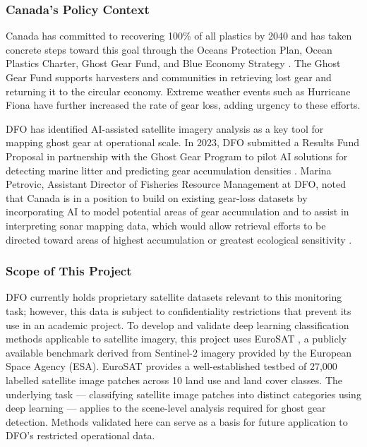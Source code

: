 \documentclass[12pt, letterpaper]{article}
\begin{document}
\subsubsection*{Canada's Policy Context}

Canada has committed to recovering 100\% of all plastics by 2040 and has taken
concrete steps toward this goal through the Oceans Protection Plan, Ocean Plastics
Charter, Ghost Gear Fund, and Blue Economy Strategy \cite{dfopsdc2023}. The Ghost
Gear Fund supports harvesters and communities in retrieving lost gear and returning
it to the circular economy. Extreme weather events such as Hurricane Fiona have
further increased the rate of gear loss, adding urgency to these efforts.

DFO has identified AI-assisted satellite imagery analysis as a key tool for mapping
ghost gear at operational scale. In 2023, DFO submitted a Results Fund Proposal in
partnership with the Ghost Gear Program to pilot AI solutions for detecting marine
litter and predicting gear accumulation densities \cite{dfopsdc2023}. Marina Petrovic,
Assistant Director of Fisheries Resource Management at DFO, noted that Canada is
in a position to build on existing gear-loss datasets by incorporating AI to model
potential areas of gear accumulation and to assist in interpreting sonar mapping
data, which would allow retrieval efforts to be directed toward areas of highest
accumulation or greatest ecological sensitivity \cite{dfopsdc2023}.

\subsubsection*{Scope of This Project}

DFO currently holds proprietary satellite datasets relevant to this monitoring task;
however, this data is subject to confidentiality restrictions that prevent its use in
an academic project. To develop and validate deep learning classification methods
applicable to satellite imagery, this project uses EuroSAT \cite{helber2019eurosat},
a publicly available benchmark derived from Sentinel-2 imagery provided by the European
Space Agency (ESA). EuroSAT provides a well-established testbed of 27,000 labelled
satellite image patches across 10 land use and land cover classes. The underlying
task --- classifying satellite image patches into distinct categories using deep
learning --- applies to the scene-level analysis required for ghost gear detection.
Methods validated here can serve as a basis for future application to DFO's
restricted operational data.
\end{document}

